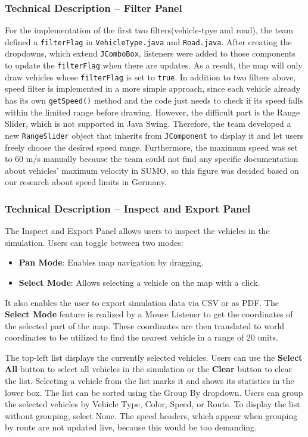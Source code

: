 \documentclass[a4paper, 12pt]{article}
\begin{document}
\subsubsection{Technical Description – Filter Panel}
For the implementation of the first two filters(vehicle-tpye and road), the team defined a \verb|filterFlag| in \verb|VehicleType.java| and \verb|Road.java|. After creating the dropdowns, which extend \verb|JComboBox|, listeners were added to those components to update the \verb|filterFlag| when there are updates. As a result, the map will only draw vehicles whose \verb|filterFlag| is set to \verb|true|.\newline
In addition to two filters above, speed filter is implemented in a more simple approach, since each vehicle already has its own \verb|getSpeed()| method and the code just needs to check if its speed falls within the limited range before drawing. However, the difficult part is the Range Slider, which is not supported in Java Swing. Therefore, the team developed a new \verb|RangeSlider| object that inherits from \verb|JComponent| to display it and let users freely choose the desired speed range. Furthermore, the maximum speed was set to 60 m/s manually because the team could not find any specific documentation about vehicles' maximum velocity in SUMO, so this figure was decided based on our research about speed limits in Germany. 

\subsubsection{Technical Description – Inspect and Export Panel}

The Inspect and Export Panel allows users to inspect the vehicles in the simulation. Users can toggle between two modes:
\begin{itemize}
    \item \textbf{Pan Mode}: Enables map navigation by dragging.
    \item \textbf{Select Mode}: Allows selecting a vehicle on the map with a click.
\end{itemize}
It also enables the user to export simulation data via CSV or as PDF.
The \textbf{Select Mode} feature is realized by a Mouse Listener to get the coordinates of the selected part of the map. These coordinates are then translated to world coordinates to be utilized to find the nearest vehicle in a range of 20 units.

The top-left list displays the currently selected vehicles. Users can use the \textbf{Select All} button to select all vehicles in the simulation or the \textbf{Clear} button to clear the list. Selecting a vehicle from the list marks it and shows its statistics in the lower box.
The list can be sorted using the Group By dropdown. Users can group the selected vehicles by Vehicle Type, Color, Speed, or Route. To display the list without grouping, select None. The speed headers, which appear when grouping by route are not updated live, because this would be too demanding.
\end{document}
